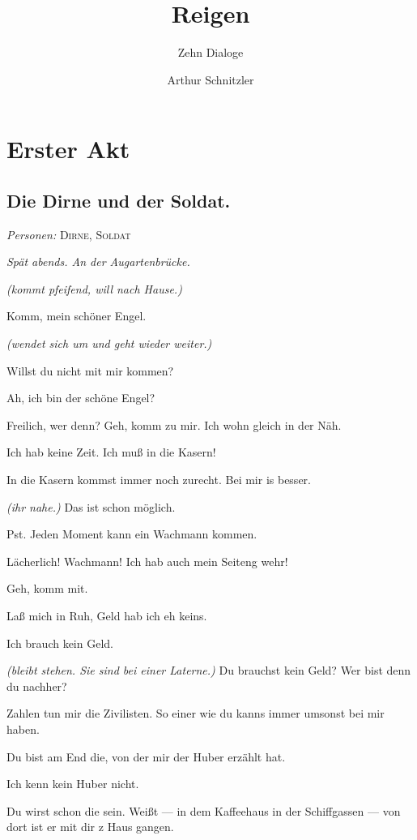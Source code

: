 \documentclass[
	final,
	a4paper,
	ngerman,
	mpinclude = true, %
	twoside = true,
	open = right,
	cleardoublepage = plain,
	DIV = 13,
	BCOR = 1cm,
	titlepage = firstiscover,
	]{scrbook}
\title{Reigen}
\subtitle{Zehn Dialoge}
\author{Arthur Schnitzler}
\date{\ifdirectorsversion{--- Regie-Version ---}{}}
\newcommand{\act}{\chapter}
\newcommand{\scene}{\section}
\newcommand{\direction}[1]{\textit{(#1)}}
\newcommand{\setting}[1]{\vspace{-0.5\baselineskip}\centering\textit{#1}}
\newcommand{\characterlist}[1]{{\begin{center}\textit{Personen:} #1\end{center}}}
\newcommand{\thecharacter}[1]{\textup{\textsc{#1}}}
\newcommand{\thedirne}{\thecharacter{Dirne}}
\newcommand{\thesoldat}{\thecharacter{Soldat}}
\newcommand{\character}[1]{\item[#1:]}
\newcommand{\dirne}{\character{\thedirne}}
\newcommand{\soldat}{\character{\thesoldat}}
\begin{document}

\cleardoubleoddemptypage

\maketitle

\tableofcontents
\cleardoubleoddpage

\pagestyle{headings}
\doublespacing
\linenumbers

\act{Erster Akt}
\scene{Die Dirne und der Soldat.}
\characterlist{\thedirne, \thesoldat}
\setting{Spät abends. An der Augartenbrücke.}
\begin{play}
	\soldat
	\direction{kommt pfeifend, will nach Hause.}

	\dirne
	Komm, mein schöner Engel.

	\soldat
	\direction{wendet sich um und geht wieder weiter.}

	\dirne
	Willst du nicht mit mir kommen?

	\soldat
	Ah, ich bin der schöne Engel?

	\dirne
	Freilich, wer denn? Geh, komm zu mir. Ich wohn gleich in der Näh.

	\soldat
	Ich hab keine Zeit. Ich muß in die Kasern!

	\dirne
	In die Kasern kommst immer noch zurecht. Bei mir is besser.

	\soldat
	\direction{ihr nahe.} Das ist schon möglich.

	\dirne
	Pst. Jeden Moment kann ein Wachmann kommen.

	\soldat
	Lächerlich! Wachmann! Ich hab auch mein Seiteng wehr!

	\dirne
	Geh, komm mit.

	\soldat
	Laß mich in Ruh, Geld hab ich eh keins.

	\dirne
	Ich brauch kein Geld.

	\soldat
	\direction{bleibt stehen. Sie sind bei einer Laterne.} Du brauchst kein Geld? Wer bist denn du nachher?

	\dirne
	Zahlen tun mir die Zivilisten. So einer wie du kanns immer umsonst bei mir haben.

	\soldat
	Du bist am End die, von der mir der Huber erzählt hat.

	\dirne
	Ich kenn kein Huber nicht.

	\soldat
	Du wirst schon die sein. Weißt --- in dem Kaffeehaus in der Schiffgassen --- von dort ist er mit dir z Haus gangen.


\end{play}
\end{document}
